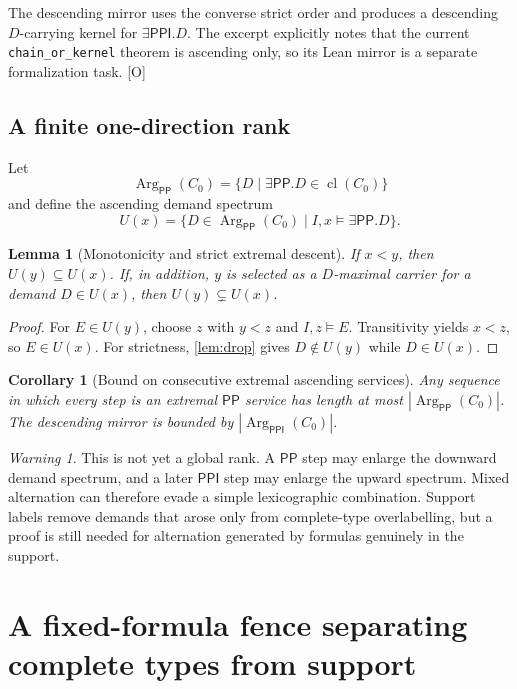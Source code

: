 \documentclass[11pt,letterpaper]{article}
\newcommand{\PP}{\ensuremath{\mathsf{PP}}}
\newcommand{\PPI}{\ensuremath{\mathsf{PPI}}}
\newcommand{\cl}{\operatorname{cl}}
\newcommand{\sat}{\models}
\newcommand{\Arg}{\operatorname{Arg}}
\newcommand{\code}[1]{\nolinkurl{#1}}
\theoremstyle{definition}
\theoremstyle{plain}
\newtheorem{lemma}[definition]{Lemma}
\newtheorem{corollary}[definition]{Corollary}
\theoremstyle{remark}
\newtheorem{warning}[definition]{Warning}
\begin{document}
The descending mirror uses the converse strict order and produces a descending
$D$-carrying kernel for $\exists\PPI.D$.  The excerpt explicitly notes that the
current \code{chain_or_kernel} theorem is ascending only, so its Lean mirror is
a separate formalization task. [O]

\subsection{A finite one-direction rank}

Let
\[
  \Arg_{\PP}(C_0)=\{D\mid \exists\PP.D\in\cl(C_0)\}
\]
and define the ascending demand spectrum
\[
  U(x)=\{D\in\Arg_{\PP}(C_0)\mid I,x\sat\exists\PP.D\}.
\]

\begin{lemma}[Monotonicity and strict extremal descent]\label{lem:spectrum}
If $x<y$, then $U(y)\subseteq U(x)$.  If, in addition, $y$ is selected as a
$D$-maximal carrier for a demand $D\in U(x)$, then
$U(y)\subsetneq U(x)$.
\end{lemma}

\begin{proof}
For $E\in U(y)$, choose $z$ with $y<z$ and $I,z\sat E$.  Transitivity yields
$x<z$, so $E\in U(x)$.  For strictness, \cref{lem:drop} gives $D\notin U(y)$
while $D\in U(x)$.
\end{proof}

\begin{corollary}[Bound on consecutive extremal ascending services]
Any sequence in which every step is an extremal $\PP$ service has length at
most $|\Arg_{\PP}(C_0)|$.  The descending mirror is bounded by
$|\Arg_{\PPI}(C_0)|$.
\end{corollary}

\begin{warning}
This is not yet a global rank.  A $\PP$ step may enlarge the downward demand
spectrum, and a later $\PPI$ step may enlarge the upward spectrum.  Mixed
alternation can therefore evade a simple lexicographic combination.  Support
labels remove demands that arose only from complete-type overlabelling, but a
proof is still needed for alternation generated by formulas genuinely in the
support.
\end{warning}

\section{A fixed-formula fence separating complete types from support}
\end{document}
